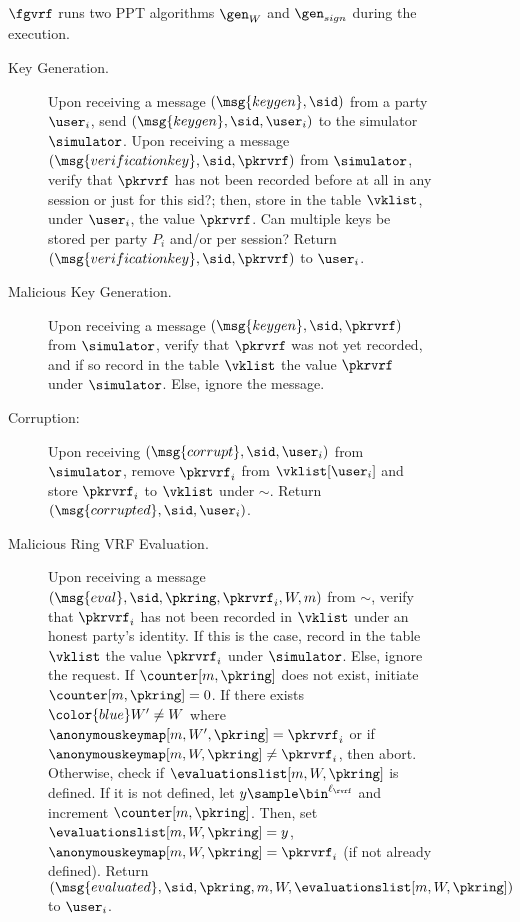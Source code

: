 \begin{figure}
	\begin{tcolorbox}
		{  $ \fgvrf $ runs two PPT algorithms $ \gen_W$ and $\gen_{sign} $ during the execution.
			
			 \begin{description}
				
				\item[Key Generation.] Upon receiving a message $(\msg{keygen}, \sid)$ from a party $\user_i$, send $(\msg{keygen}, \sid, \user_i)$ to the simulator $\simulator$.
				Upon receiving a message $(\msg{verificationkey}, \sid, \pkrvrf)$ from $\simulator$, verify that $\pkrvrf$ has not been recorded before {\color{blue} at all in any session or just for this sid?}; then, store in the table $\vklist$, under $\user_i$, the value $\pkrvrf$. {\color{blue} Can multiple keys be stored per party $P_i$ and/or per session?}
				Return $(\msg{verificationkey}, \sid, \pkrvrf)$ to $ \user_i$.
				
				\item[Malicious Key Generation.] Upon receiving a message $(\msg{keygen}, \sid, \pkrvrf)$ from $\simulator$, verify that $\pkrvrf$ was not yet recorded, and if so record in the table $\vklist$ the value $\pkrvrf$ under $\simulator$. Else, ignore the message.
				
				\item [Corruption:]  Upon receiving $ (\msg{corrupt}, \sid, \user_i) $ from $ \simulator $, remove $ \pkrvrf_i $ from $ \vklist[\user_i] $ and store $ \pkrvrf_i $ to $ \vklist $ under $ \sim $. Return $ (\msg{corrupted}, \sid,\user_i) $.
				\item[Malicious Ring VRF Evaluation.] Upon receiving a message $(\msg{eval}, \sid, \pkring, \pkrvrf_i, W, m)$ from $\sim$, verify that $ \pkrvrf_i $ has not been recorded in $\vklist$ under an honest party's identity.
			    If this is the case, record in the table $\vklist$ the value $\pkrvrf_i$ under $\simulator$. Else, ignore the request.  If $ \counter[m,\pkring] $ does not exist, initiate $ \counter[m,\pkring] = 0 $. If there exists ${\color{blue} W' \neq W }$ where 
			    {\color{blue} $\anonymouskeymap[m,W',\pkring] = \pkrvrf_i$ or if $\anonymouskeymap[m,W,\pkring] \neq \pkrvrf_i$}, then abort. 
			    Otherwise, check if $ \evaluationslist[m,W,\pkring] $ is defined. If it is not defined, let   $y \sample \bin^{\ell_\rvrf}$ and increment $ \counter[m,\pkring] $. Then, set $ \evaluationslist[m, W, \pkring] = y$, $ \anonymouskeymap[m,W,\pkring] = \pkrvrf_i $ (if not already defined).
				Return $(\msg{evaluated}, \sid, \pkring, m, W, \evaluationslist[m, W, \pkring])$ to $ \user_i $.
				

\end{description}}
\end{tcolorbox}
\end{figure}

